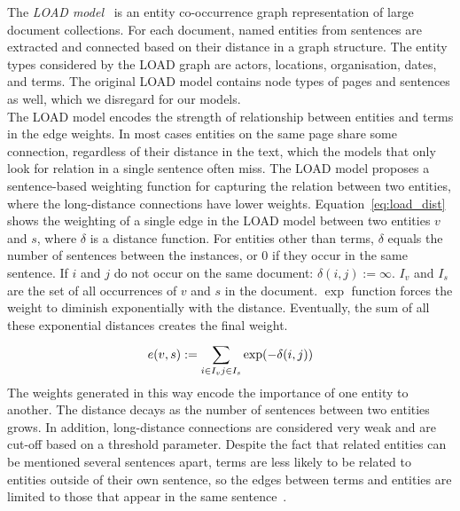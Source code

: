 The \emph{LOAD model}~ is an entity co-occurrence graph representation of large document collections. For each document, named entities from sentences are extracted and connected based on their distance in a graph structure. The entity types considered by the LOAD graph are actors, locations, organisation, dates, and terms. The original LOAD model contains node types of pages and sentences as well, which we disregard for our models.\\
The LOAD model encodes the strength of relationship between entities and terms in the edge weights. In most cases entities on the same page share some connection, regardless of their distance in the text, which the models that only look for relation in a single sentence often miss. The LOAD model proposes a sentence-based weighting function for capturing the relation between two entities, where the long-distance connections have lower weights. Equation~\ref{eq:load_dist} shows the weighting of a single edge in the LOAD model between two entities $v$ and $s$, where $\delta $ is a distance function. For entities other than terms, $\delta $ equals the number of sentences between the instances, or $0$ if they occur in the same sentence.
If $i$ and $ j$ do not occur on the same document: $ \delta(i, j) := \infty$. $ I_{ v }$ and $I_{ s } $ are the set of all occurrences of $v$ and $s$ in the document. $\exp$ function forces the weight to diminish exponentially with the distance. Eventually, the sum of all these exponential distances creates the final weight.
\begin{equation}
e (v,s) :=\sum _{ i\in I_{ v } \\ j\in I_{ s } }^{  }{ \exp } (-\delta (i,j))
\label{eq:load_dist}
\end{equation}
The weights generated in this way encode the importance of one entity to another. The distance decays as the number of sentences between two entities grows. In addition, long-distance connections are considered very weak and are cut-off based on a threshold parameter. 
Despite the fact that related entities can be mentioned several sentences apart, terms are less likely to be related to entities outside of their own sentence, so the edges between terms and entities are limited to those that appear in the same sentence~. 
